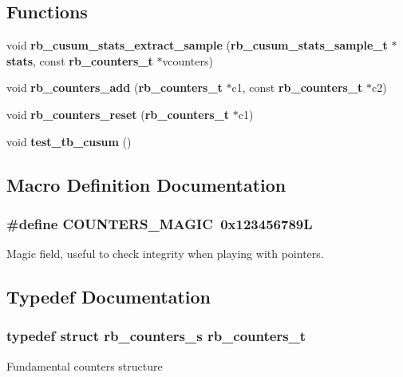 \subsection*{Functions}
\begin{DoxyCompactItemize}
\item 
void {\bf rb\+\_\+cusum\+\_\+stats\+\_\+extract\+\_\+sample} ({\bf rb\+\_\+cusum\+\_\+stats\+\_\+sample\+\_\+t} $\ast${\bf stats}, const {\bf rb\+\_\+counters\+\_\+t} $\ast$vcounters)
\item 
void {\bf rb\+\_\+counters\+\_\+add} ({\bf rb\+\_\+counters\+\_\+t} $\ast$c1, const {\bf rb\+\_\+counters\+\_\+t} $\ast$c2)
\item 
void {\bf rb\+\_\+counters\+\_\+reset} ({\bf rb\+\_\+counters\+\_\+t} $\ast$c1)
\item 
void {\bf test\+\_\+tb\+\_\+cusum} ()
\end{DoxyCompactItemize}


\subsection{Macro Definition Documentation}
\subsubsection[{C\+O\+U\+N\+T\+E\+R\+S\+\_\+\+M\+A\+G\+I\+C}]{\setlength{\rightskip}{0pt plus 5cm}\#define C\+O\+U\+N\+T\+E\+R\+S\+\_\+\+M\+A\+G\+I\+C~0x123456789\+L}\label{rb__counters_8h_a405bc741645ce00e567403fa7f1ebc26}


Magic field, useful to check integrity when playing with pointers. 



\subsection{Typedef Documentation}
\subsubsection[{rb\+\_\+counters\+\_\+t}]{\setlength{\rightskip}{0pt plus 5cm}typedef struct {\bf rb\+\_\+counters\+\_\+s} {\bf rb\+\_\+counters\+\_\+t}}\label{rb__counters_8h_ae668e148b712edfabc2b1df94e91f5f4}
Fundamental counters structure 

